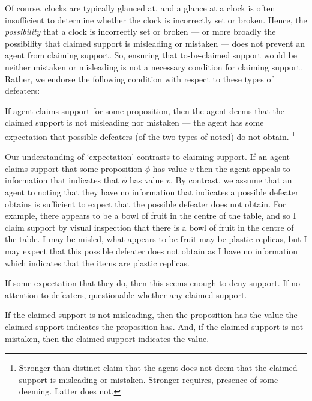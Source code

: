 \begin{note}
  Of course, clocks are typically glanced at, and a glance at a clock is often insufficient to determine whether the clock is incorrectly set or broken.
  Hence, the \emph{possibility} that a clock is incorrectly set or broken --- or more broadly the possibility that claimed support is misleading or mistaken --- does not prevent an agent from claiming support.
  So, ensuring that to-be-claimed support would be neither mistaken or misleading is not a necessary condition for claiming support.
  Rather, we endorse the following condition with respect to these types of defeaters:

  \begin{proposition}\label{prop:CSNMORM}
    If agent claims support for some proposition, then
    the agent deems that the claimed support
    is not misleading nor mistaken --- the agent has some expectation that possible defeaters (of the two types of noted) do not obtain.\nolinebreak
    \footnote{
      Stronger than distinct claim that the agent does not deem that the claimed support is misleading or mistaken.
      Stronger requires, presence of some deeming.
      Latter does not.
    }
  \end{proposition}
  Our understanding of `expectation' contrasts to claiming support.
  If an agent claims support that some proposition \(\phi\) has value \(v\) then the agent appeals to information that indicates that \(\phi\) has value \(v\).
  By contrast, we assume that an agent to noting that they have no information that indicates a possible defeater obtains is sufficient to expect that the possible defeater does not obtain.
  For example, there appears to be a bowl of fruit in the centre of the table, and so I claim support by visual inspection that there is a bowl of fruit in the centre of the table.
  I may be misled, what appears to be fruit may be plastic replicas, but I may expect that this possible defeater does not obtain as I have no information which indicates that the items are plastic replicas.

  If some expectation that they do, then this seems enough to deny support.
  If no attention to defeaters, questionable whether any claimed support.

  If the claimed support is not misleading, then the proposition has the value the claimed support indicates the proposition has.
  And, if the claimed support is not mistaken, then the claimed support indicates the value.
\end{note}

